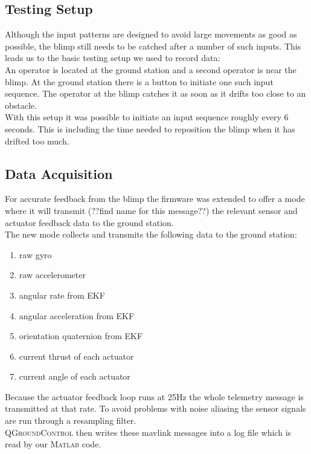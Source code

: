 \subsection{Testing Setup}
\label{sub:testing_setup}
Although the input patterns are designed to avoid large movements as good as possible, the blimp still needs to be catched after a number of such inputs. This leads us to the basic testing setup we used to record data: \\
An operator is located at the ground station and a second operator is near the blimp.
At the ground station there is a button to initiate one such input sequence.
The operator at the blimp catches it as soon as it drifts too close to an obstacle. \\
With this setup it was possible to initiate an input sequence roughly every 6 seconds. 
This is including the time needed to reposition the blimp when it has drifted too much.

\subsection{Data Acquisition}
\label{sub:data_acquisition}
For accurate feedback from the blimp the firmware was extended to offer a mode where it will transmit (??find name for this message??) the relevant sensor and actuator feedback data to the ground station. \\
The new mode collects and transmits the following data to the ground station:
\begin{enumerate}
\item raw gyro
\item raw accelerometer
\item angular rate from EKF
\item angular acceleration from EKF
\item orientation quaternion from EKF
\item current thrust of each actuator
\item current angle of each actuator
\end{enumerate}
Because the actuator feedback loop runs at 25Hz the whole telemetry message is transmitted at that rate.
To avoid problems with noise aliasing the sensor signals are run through a resampling filter. \\
\textsc{QGroundControl} then writes these mavlink messages into a log file which is read by our \textsc{Matlab} code.

